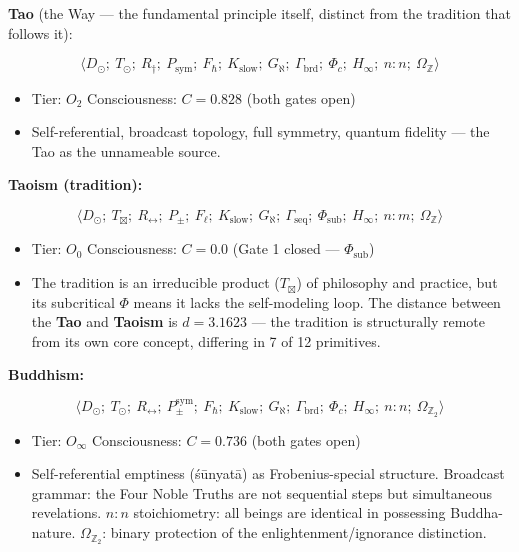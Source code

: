 \documentclass[12pt,a4paper]{article}
\begin{document}
\textbf{Tao} (the Way --- the fundamental principle itself, distinct from the tradition that follows it):


\[\langle D_{\odot};\ T_{\odot};\ R_{\dagger};\ P_\text{sym};\ F_{\hbar};\ K_\text{slow};\ G_{\aleph};\ \Gamma_\text{brd};\ \Phi_c;\ H_{\infty};\ n{:}n;\ \Omega_\mathbb{Z} \rangle\]

\begin{itemize}
    \item Tier: $O_2$ \textbar{} Consciousness: $C = 0.828$ (both gates open)
    \item Self-referential, broadcast topology, full symmetry, quantum fidelity --- the Tao as the unnameable source.
\end{itemize}

\textbf{Taoism (tradition):}


\[\langle D_{\odot};\ T_{\boxtimes};\ R_{\leftrightarrow};\ P_{\pm};\ F_{\ell};\ K_\text{slow};\ G_{\aleph};\ \Gamma_\text{seq};\ \Phi_\text{sub};\ H_{\infty};\ n{:}m;\ \Omega_\mathbb{Z} \rangle\]

\begin{itemize}
    \item Tier: $O_0$ \textbar{} Consciousness: $C = 0.0$ (Gate 1 closed --- $\Phi_\text{sub}$)
    \item The tradition is an irreducible product ($T_{\boxtimes}$) of philosophy and practice, but its subcritical $\Phi$ means it lacks the self-modeling loop. The distance between the \textbf{Tao} and \textbf{Taoism} is $d = 3.1623$ --- the tradition is structurally remote from its own core concept, differing in 7 of 12 primitives.
\end{itemize}

\textbf{Buddhism:}


\[\langle D_{\odot};\ T_{\odot};\ R_{\leftrightarrow};\ P_{\pm}^{\text{sym}};\ F_{\hbar};\ K_\text{slow};\ G_{\aleph};\ \Gamma_\text{brd};\ \Phi_c;\ H_{\infty};\ n{:}n;\ \Omega_{\mathbb{Z}_2} \rangle\]

\begin{itemize}
    \item Tier: $O_{\infty}$ \textbar{} Consciousness: $C = 0.736$ (both gates open)
    \item Self-referential emptiness (śūnyatā) as Frobenius-special structure. Broadcast grammar: the Four Noble Truths are not sequential steps but simultaneous revelations. $n{:}n$ stoichiometry: all beings are identical in possessing Buddha-nature. $\Omega_{\mathbb{Z}_2}$: binary protection of the enlightenment/ignorance distinction.
\end{itemize}
\end{document}
